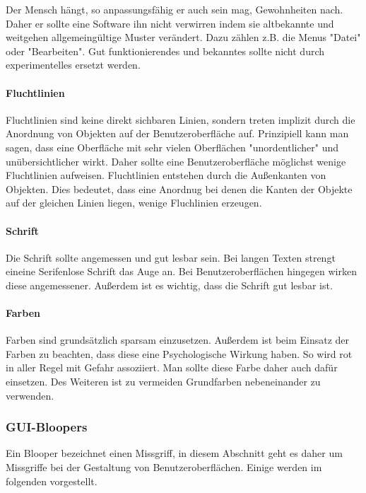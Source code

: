 Der Mensch hängt, so anpassungsfähig er auch sein mag, Gewohnheiten nach. Daher
er sollte eine Software ihn nicht verwirren indem sie altbekannte und weitgehen
allgemeingültige Muster verändert. Dazu zählen z.B. die Menus "Datei" oder
"Bearbeiten". Gut funktionierendes und bekanntes sollte nicht durch
experimentelles ersetzt werden.

\paragraph{Fluchtlinien}

Fluchtlinien sind keine direkt sichbaren Linien, sondern treten implizit durch
die Anordnung von Objekten auf der Benutzeroberfläche auf. Prinzipiell kann man
sagen, dass eine Oberfläche mit sehr vielen Oberflächen "unordentlicher" und
unübersichtlicher wirkt. Daher sollte eine Benutzeroberfläche möglichst wenige
Fluchtlinien aufweisen. Fluchtlinien entstehen durch die Außenkanten von
Objekten. Dies bedeutet, dass eine Anordnug bei denen die Kanten der Objekte auf 
der gleichen Linien liegen, wenige Fluchlinien erzeugen.

\paragraph{Schrift}

Die Schrift sollte angemessen und gut lesbar sein. Bei langen Texten strengt
eineine Serifenlose Schrift das Auge an. Bei Benutzeroberflächen hingegen wirken
diese angemessener. Außerdem ist es wichtig, dass die Schrift gut lesbar ist.

\paragraph{Farben}

Farben sind grundsätzlich sparsam einzusetzen. Außerdem ist beim Einsatz der
Farben zu beachten, dass diese eine Psychologische Wirkung haben. So wird rot in
aller Regel mit Gefahr assoziiert. Man sollte diese Farbe daher auch dafür
einsetzen. Des Weiteren ist zu vermeiden Grundfarben nebeneinander zu verwenden.

\subsubsection{GUI-Bloopers}

Ein Blooper bezeichnet einen Missgriff, in diesem Abschnitt geht es daher um
Missgriffe bei der Gestaltung von Benutzeroberflächen. Einige werden im
folgenden vorgestellt.

